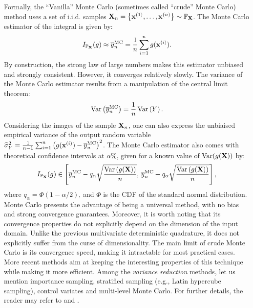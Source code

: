 Formally, the ``Vanilla'' Monte Carlo (sometimes called ``crude'' Monte Carlo) method uses a set of i.i.d. samples ${\bf X}_n = \left\{{\bf x}^{(1)}, \dots, {\bf x}^{(n)}\right\} \sim \mathbb{P}_{{\bf X}}$. 
The Monte Carlo estimator of the integral is given by: 
\begin{equation}
    I_{\mathbb{P}_{{\bf X}}}(g) \approx \overline{y}_n^{\textrm{MC}} = \frac1n \sum_{i=1}^{n} g({\bf x}^{(i)}).
\end{equation}
By construction, the strong law of large numbers makes this estimator unbiased and strongly consistent. 
However, it converges relatively slowly. 
The variance of the Monte Carlo estimator results from a manipulation of the central limit theorem:
\begin{equation}
    \operatorname{Var}\left(\overline{y}_n^{\textrm{MC}}\right) = \frac{1}{n} \operatorname{Var}\left(Y\right). 
    \label{eq:MC_variance}
\end{equation}
Considering the images of the sample ${\bf X}_n$, one can also express the unbiaised empirical variance of the output random variable $\widehat{\sigma}^2_Y = \frac{1}{n-1} \sum_{i=1}^n \left(g({\bf x}^{(i)}) - \overline{y}_n^{\textrm{MC}}\right)^2$.
The Monte Carlo estimator also comes with theoretical confidence intervals at $\alpha \%$, given for a known value of $\operatorname{Var}(g({\bf X}))$ by: 
\begin{equation}
    I_{\mathbb{P}_{{\bf X}}}(g) \in \left[\overline{y}_n^{\textrm{MC}}  - q_\alpha \sqrt{\frac{\operatorname{Var}\left(g({\bf X})\right)}{n}}, \, \overline{y}_n^{\textrm{MC}}  + q_\alpha \sqrt{\frac{\operatorname{Var}\left(g({\bf X})\right)}{n}} \right],
    \label{eq:MC_IC}
\end{equation}
where $q_\alpha = \Phi(1 - \alpha/2)$, and $\Phi$ is the CDF of the standard normal distribution. 
Monte Carlo presents the advantage of being a universal method, with no bias and strong convergence guarantees. 
Moreover, it is worth noting that its convergence properties do not explicitly depend on the dimension of the input domain. 
Unlike the previous multivariate deterministic quadrature, it does not explicitly suffer from the curse of dimensionality. 
The main limit of crude Monte Carlo is its convergence speed, making it intractable for most practical cases. 
More recent methods aim at keeping the interesting properties of this technique while making it more efficient. 
Among the \textit{variance reduction} methods, let us mention importance sampling, stratified sampling (e.g., Latin hypercube sampling), control variates and multi-level Monte Carlo. 
For further details, the reader may refer to \citet[Chap. 8,9,10]{owen_2013} and \citep{giles_2008}.


